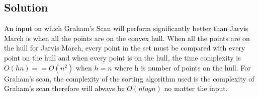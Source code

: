 \subsection*{Solution}
An input on which Graham's Scan will perform significantly better than Jarvis March is when all the points are on the convex hull. When all the points are on the hull for Jarvis March, every point in the set must be compared with every point on the hull and when every point is on the hull, the time complexity is $O(hn) == O(n^2)$ when $h=n$ where h is number of points on the hull. For Graham's scan, the complexity of the sorting algorithm used is the complexity of Graham's scan therefore will always be $O(nlog n)$ no matter the input.

